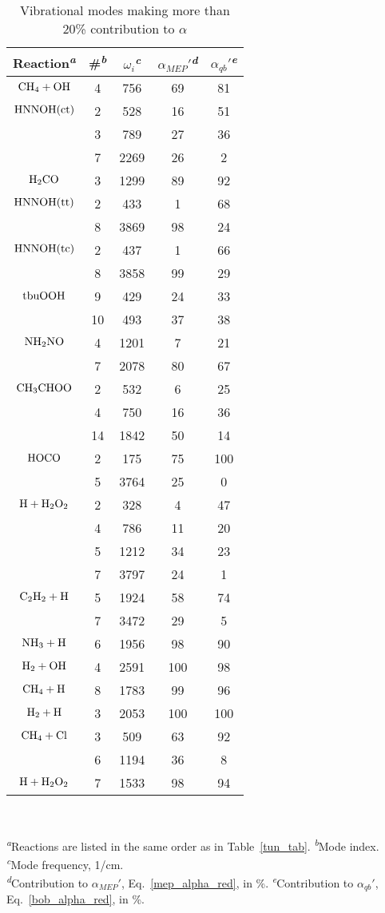 \documentclass[journal=jpcafh,manuscript=article]{achemso}
\begin{document}
\begin{table}
\caption{Vibrational modes making more than 20\% contribution to $\alpha$}
\begin{tabular}{|ccccc|} \hline
  Reaction\textsuperscript{\emph{a}}
  & \#\textsuperscript{\emph{b}}
  & $\omega_i$\textsuperscript{\emph{c}}
  & $\alpha_{MEP}'$\textsuperscript{\emph{d}}
  & $\alpha_{qb}'$\textsuperscript{\emph{e}}
  \\ \hline
  $\rm CH_4+OH$
  &4&756&69&81\\
  $\rm HNNOH(ct)$
  &2&528&16&51\\
  &3&789&27&36\\
  &7&2269&26&2\\
  $\rm H_2CO$
  &3&1299&89&92\\
  $\rm HNNOH(tt)$
  &2&433&1&68\\
  &8&3869&98&24\\
  $\rm HNNOH(tc)$
  &2&437&1&66\\
  &8&3858&99&29\\
  $\rm tbuOOH$
  &9&429&24&33\\
  &10&493&37&38\\
  $\rm NH_2NO$
  &4&1201&7&21\\
  &7&2078&80&67\\
  $\rm CH_3CHOO$
  &2&532&6&25\\
  &4&750&16&36\\
  &14&1842&50&14\\
  $\rm HOCO$
  &2&175&75&100\\
  &5&3764&25&0\\
  $\rm H+H_2O_2$
  &2&328&4&47\\
  &4&786&11&20\\
  &5&1212&34&23\\
  &7&3797&24&1\\
  $\rm C_2H_2+H$
  &5&1924&58&74\\
  &7&3472&29&5\\
  $\rm NH_3+H$
  &6&1956&98&90\\
  $\rm H_2+OH$
  &4&2591&100&98\\
  $\rm CH_4+H$
  &8&1783&99&96\\
  $\rm H_2+H$
  &3&2053&100&100\\
  $\rm CH_4+Cl$
  &3&509&63&92\\
  &6&1194&36&8\\
  $\rm H+H_2O_2$
  &7&1533&98&94\\ \hline
\end{tabular}\\
\begin{flushleft}
\textsuperscript{\emph{a}}Reactions are listed in the same order as in
Table~\ref{tun_tab}. \textsuperscript{\emph{b}}Mode index. \textsuperscript{\emph{c}}Mode frequency, 1/cm.\\
\textsuperscript{\emph{d}}Contribution to $\alpha_{MEP}'$,
Eq.~\ref{mep_alpha_red}, in \%. \textsuperscript{\emph{e}}Contribution to $\alpha_{qb}'$,
Eq.~\ref{bob_alpha_red}, in \%.
\end{flushleft}
\label{tun1_tab}
\end{table}
\end{document}
